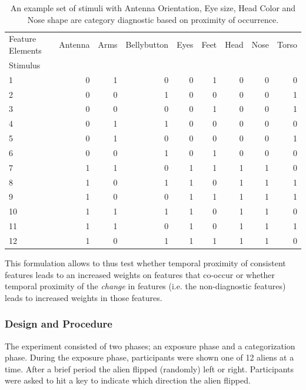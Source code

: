 \begin{table}
\centering
\label{tab:category-features-example}
\caption{An example set of stimuli with Antenna Orientation, Eye size, Head Color and Nose shape are category diagnostic based on proximity of occurrence.}
\begin{tabular}{lrrrrrrrr}
    \toprule
    Feature Elements & Antenna & Arms & Bellybutton & Eyes & Feet & Head & Nose & Torso \\
    Stimulus &  &  &  &  &  &  &  &  \\
    \midrule
    1 & 0 & 1 & 0 & 0 & 1 & 0 & 0 & 0 \\
    2 & 0 & 0 & 1 & 0 & 0 & 0 & 0 & 1 \\
    3 & 0 & 0 & 0 & 0 & 1 & 0 & 0 & 1 \\
    4 & 0 & 1 & 1 & 0 & 0 & 0 & 0 & 0 \\
    5 & 0 & 1 & 0 & 0 & 0 & 0 & 0 & 1 \\
    6 & 0 & 0 & 1 & 0 & 1 & 0 & 0 & 0 \\
    7 & 1 & 1 & 0 & 1 & 1 & 1 & 1 & 0 \\
    8 & 1 & 0 & 1 & 1 & 0 & 1 & 1 & 1 \\
    9 & 1 & 0 & 0 & 1 & 1 & 1 & 1 & 1 \\
    10 & 1 & 1 & 1 & 1 & 0 & 1 & 1 & 0 \\
    11 & 1 & 1 & 0 & 1 & 0 & 1 & 1 & 1 \\
    12 & 1 & 0 & 1 & 1 & 1 & 1 & 1 & 0 \\
    \bottomrule
\end{tabular}

\end{table}

This formulation allows to thus test whether temporal proximity of consistent features leads to an increased weights on features that co-occur or whether temporal proximity of the \textit{change} in features (i.e. the non-diagnostic features) leads to increased weights in those features. 


        
\subsubsection*{Design and Procedure}

The experiment consisted of two phases; an exposure phase and a categorization phase. During the exposure phase, participants were shown one of 12 aliens at a time. After a brief period the alien flipped (randomly) left or right. Participants were asked to hit a key to indicate which direction the alien flipped. 


